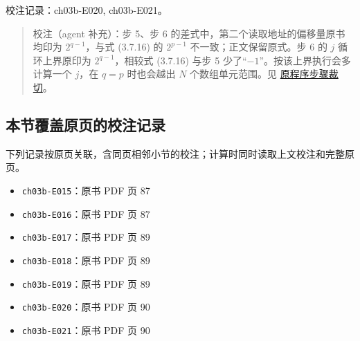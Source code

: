 \documentclass[
  10pt,
  fontset=fandol]{ctexart}
\providecommand{\tightlist}{%
  \setlength{\itemsep}{0pt}\setlength{\parskip}{0pt}}
\begin{document}
校注记录：ch03b-E020, ch03b-E021。

\begin{quote}
校注（agent 补充）：步 5、步 6 的差式中，第二个读取地址的偏移量原书均印为 \(2^{q-1}\)，与式 (3.7.16) 的 \(2^{p-1}\) 不一致；正文保留原式。步 6 的 \(j\) 循环上界原印为 \(2^{q-1}\)，相较式 (3.7.16) 与步 5 少了``\(-1\)''。按该上界执行会多计算一个 \(j\)，在 \(q=p\) 时也会越出 \(N\) 个数组单元范围。见 \href{../assets/ch03b/p090-fft-steps.png}{原程序步骤裁切}。
\end{quote}

\subsection{本节覆盖原页的校注记录}\label{ux672cux8282ux8986ux76d6ux539fux9875ux7684ux6821ux6ce8ux8bb0ux5f55}

下列记录按原页关联，含同页相邻小节的校注；计算时同时读取上文校注和完整原页。

\begin{itemize}
\tightlist
\item
  \texttt{ch03b-E015}：原书 PDF 页 87
\item
  \texttt{ch03b-E016}：原书 PDF 页 87
\item
  \texttt{ch03b-E017}：原书 PDF 页 89
\item
  \texttt{ch03b-E018}：原书 PDF 页 89
\item
  \texttt{ch03b-E019}：原书 PDF 页 89
\item
  \texttt{ch03b-E020}：原书 PDF 页 90
\item
  \texttt{ch03b-E021}：原书 PDF 页 90
\end{itemize}
\end{document}
